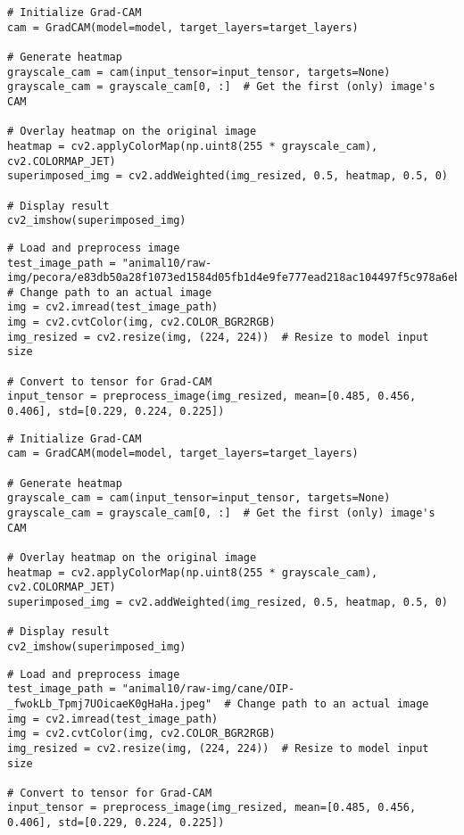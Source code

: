\documentclass{article}
\begin{document}
\begin{verbatim}
# Initialize Grad-CAM
cam = GradCAM(model=model, target_layers=target_layers)

# Generate heatmap
grayscale_cam = cam(input_tensor=input_tensor, targets=None)
grayscale_cam = grayscale_cam[0, :]  # Get the first (only) image's CAM

# Overlay heatmap on the original image
heatmap = cv2.applyColorMap(np.uint8(255 * grayscale_cam), cv2.COLORMAP_JET)
superimposed_img = cv2.addWeighted(img_resized, 0.5, heatmap, 0.5, 0)

# Display result
cv2_imshow(superimposed_img)
\end{verbatim}

\begin{verbatim}
# Load and preprocess image
test_image_path = "animal10/raw-img/pecora/e83db50a28f1073ed1584d05fb1d4e9fe777ead218ac104497f5c978a6ebb3bf_640.jpg"  # Change path to an actual image
img = cv2.imread(test_image_path)
img = cv2.cvtColor(img, cv2.COLOR_BGR2RGB)
img_resized = cv2.resize(img, (224, 224))  # Resize to model input size

# Convert to tensor for Grad-CAM
input_tensor = preprocess_image(img_resized, mean=[0.485, 0.456, 0.406], std=[0.229, 0.224, 0.225])
\end{verbatim}

\begin{verbatim}
# Initialize Grad-CAM
cam = GradCAM(model=model, target_layers=target_layers)

# Generate heatmap
grayscale_cam = cam(input_tensor=input_tensor, targets=None)
grayscale_cam = grayscale_cam[0, :]  # Get the first (only) image's CAM

# Overlay heatmap on the original image
heatmap = cv2.applyColorMap(np.uint8(255 * grayscale_cam), cv2.COLORMAP_JET)
superimposed_img = cv2.addWeighted(img_resized, 0.5, heatmap, 0.5, 0)

# Display result
cv2_imshow(superimposed_img)
\end{verbatim}

\begin{verbatim}
# Load and preprocess image
test_image_path = "animal10/raw-img/cane/OIP-_fwokLb_Tpmj7UOicaeK0gHaHa.jpeg"  # Change path to an actual image
img = cv2.imread(test_image_path)
img = cv2.cvtColor(img, cv2.COLOR_BGR2RGB)
img_resized = cv2.resize(img, (224, 224))  # Resize to model input size

# Convert to tensor for Grad-CAM
input_tensor = preprocess_image(img_resized, mean=[0.485, 0.456, 0.406], std=[0.229, 0.224, 0.225])
\end{verbatim}
\end{document}
